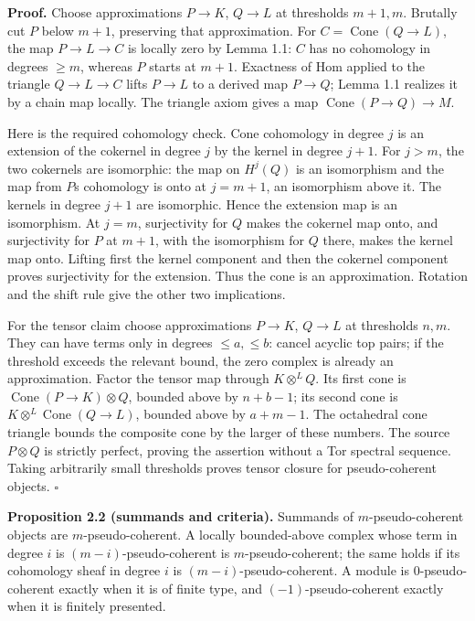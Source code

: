 \documentclass[
  english,
  11pt,
  a4paper,
]{article}
\begin{document}
\textbf{Proof.} Choose approximations \(P\to K\), \(Q\to L\) at
thresholds \(m+1,m\). Brutally cut \(P\) below \(m+1\), preserving that
approximation. For \(C=\operatorname{Cone}(Q\to L)\), the map
\(P\to L\to C\) is locally zero by Lemma 1.1: \(C\) has no cohomology in
degrees \(\ge m\), whereas \(P\) starts at \(m+1\). Exactness of Hom
applied to the triangle \(Q\to L\to C\) lifts \(P\to L\) to a derived
map \(P\to Q\); Lemma 1.1 realizes it by a chain map locally. The
triangle axiom gives a map \(\operatorname{Cone}(P\to Q)\to M\).

Here is the required cohomology check. Cone cohomology in degree \(j\)
is an extension of the cokernel in degree \(j\) by the kernel in degree
\(j+1\). For \(j>m\), the two cokernels are isomorphic: the map on
\(H^j(Q)\) is an isomorphism and the map from \(P\)\textquotesingle s
cohomology is onto at \(j=m+1\), an isomorphism above it. The kernels in
degree \(j+1\) are isomorphic. Hence the extension map is an
isomorphism. At \(j=m\), surjectivity for \(Q\) makes the cokernel map
onto, and surjectivity for \(P\) at \(m+1\), with the isomorphism for
\(Q\) there, makes the kernel map onto. Lifting first the kernel
component and then the cokernel component proves surjectivity for the
extension. Thus the cone is an approximation. Rotation and the shift
rule give the other two implications.

For the tensor claim choose approximations \(P\to K\), \(Q\to L\) at
thresholds \(n,m\). They can have terms only in degrees \(\le a,\le b\):
cancel acyclic top pairs; if the threshold exceeds the relevant bound,
the zero complex is already an approximation. Factor the tensor map
through \(K\otimes^L Q\). Its first cone is
\(\operatorname{Cone}(P\to K)\otimes Q\), bounded above by \(n+b-1\);
its second cone is \(K\otimes^L\operatorname{Cone}(Q\to L)\), bounded
above by \(a+m-1\). The octahedral cone triangle bounds the composite
cone by the larger of these numbers. The source \(P\otimes Q\) is
strictly perfect, proving the assertion without a Tor spectral sequence.
Taking arbitrarily small thresholds proves tensor closure for
pseudo-coherent objects. \(\square\)

\textbf{Proposition 2.2 (summands and criteria).} Summands of
\(m\)-pseudo-coherent objects are \(m\)-pseudo-coherent. A locally
bounded-above complex whose term in degree \(i\) is
\((m-i)\)-pseudo-coherent is \(m\)-pseudo-coherent; the same holds if
its cohomology sheaf in degree \(i\) is \((m-i)\)-pseudo-coherent. A
module is \(0\)-pseudo-coherent exactly when it is of finite type, and
\((-1)\)-pseudo-coherent exactly when it is finitely presented.
\end{document}
